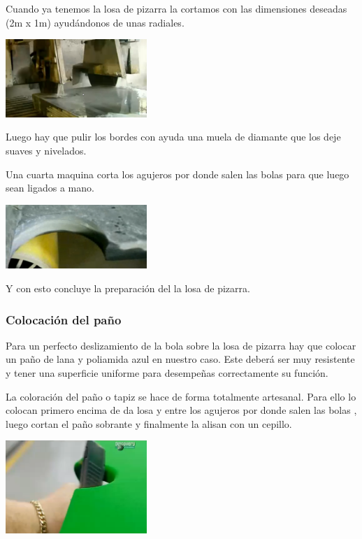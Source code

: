 Cuando ya tenemos la losa de pizarra la cortamos con las dimensiones deseadas (2m x 1m) ayudándonos de unas radiales. 
\begin{center}
	    		\includegraphics[width=0.4\textwidth]{Pantallazo-6.png}

	\end{center}

Luego hay que  pulir los bordes con ayuda una muela de diamante que los deje suaves y nivelados.

Una cuarta maquina corta los agujeros por donde salen las bolas para que luego sean ligados a mano.

\begin{center}
	    		\includegraphics[width=0.4\textwidth]{Pantallazo-7.png}

	\end{center} Y con esto concluye la preparación del la losa de pizarra.
 
		\subsubsection {Colocación del paño}
  	
 	Para un perfecto deslizamiento de la bola sobre la losa de pizarra hay que colocar un paño de lana y poliamida azul en nuestro caso. Este deberá ser muy resistente y tener una superficie uniforme para desempeñas correctamente su función.

	La coloración del paño o tapiz se hace de forma totalmente artesanal. Para ello lo colocan primero encima de da losa y entre los agujeros por donde salen las bolas , luego cortan el paño sobrante y finalmente la alisan con un cepillo. 

	\begin{center}
    			\includegraphics[width=0.4\textwidth]{Pantallazo.png}
		\end{center}
   
